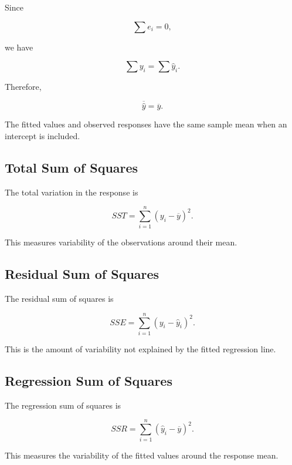 Since

\[
\sum e_i=0,
\]

we have

\[
\sum y_i
=
\sum\widehat{y}_i.
\]

Therefore,

\[
\boxed{
\overline{\widehat{y}}
=
\overline{y}.
}
\]

The fitted values and observed responses have the same sample mean when
an intercept is included.

\subsection{Total Sum of Squares}
\label{subsec:total-sum-squares}

The total variation in the response is

\[
\boxed{
SST
=
\sum_{i=1}^{n}
(y_i-\overline{y})^2.
}
\]

This measures variability of the observations around their mean.

\subsection{Residual Sum of Squares}
\label{subsec:residual-sum-squares}

The residual sum of squares is

\[
\boxed{
SSE
=
\sum_{i=1}^{n}
(y_i-\widehat{y}_i)^2.
}
\]

This is the amount of variability not explained by the fitted regression
line.

\subsection{Regression Sum of Squares}
\label{subsec:regression-sum-squares}

The regression sum of squares is

\[
\boxed{
SSR
=
\sum_{i=1}^{n}
(\widehat{y}_i-\overline{y})^2.
}
\]

This measures the variability of the fitted values around the response
mean.

